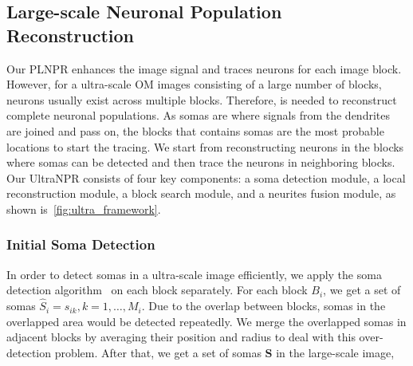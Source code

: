 \subsection{Large-scale Neuronal Population Reconstruction}
\label{sec:UltraNPR}



Our PLNPR enhances the image signal and traces neurons for each image block.
However, for a ultra-scale OM images consisting of a large number of blocks, neurons usually exist across multiple blocks. 
Therefore,  is needed to reconstruct complete neuronal populations. 
%
As somas are where signals from the dendrites are joined and pass on, the blocks that contains somas are the most probable locations to start the tracing.
We start from reconstructing neurons in the blocks where somas can be detected and then trace the neurons in neighboring blocks.  
%
Our UltraNPR consists of four key components: a soma detection module, a local reconstruction module, a block search module, and a neurites fusion module, as shown is~\ref{fig:ultra_framework}.


\subsubsection{Initial Soma Detection}
\label{sec:soma}

In order to detect somas in a ultra-scale image efficiently, we apply the soma detection algorithm~\cite{Quan2013} on each block separately. 
%
For each block $B_{i}$, we get a set of somas $\hat{S}_i = s_{ik}, k=1,\ldots,M_{i} $. 
Due to the overlap between blocks, somas in the overlapped area would be detected repeatedly.
We merge the overlapped somas in adjacent blocks by averaging their position and radius to deal with this over-detection problem.
After that, we get a set of somas $ \mathbf{S} $ in the large-scale image, 


